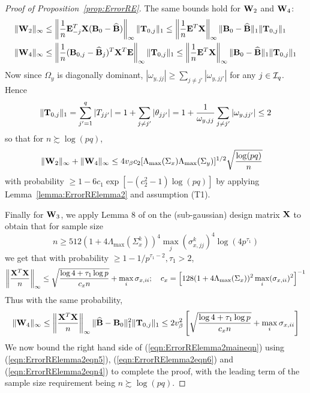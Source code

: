 \documentclass[12pt, letterpaper]{article}
\numberwithin{equation}{section}
\begin{document}
\begin{proof}[Proof of Proposition~\ref{prop:ErrorRE}]
The same bounds hold for ${\mathbf{W}}_2$ and ${\mathbf{W}}_4$:
%
\begin{align*}
\| {\mathbf{W}}_2 \|_\infty & \leq \left\| \frac{1}{n} {\mathbf{E}}_{-j}^T {\mathbf{X}} ({\mathbf{B}}_0 - \widehat {{\mathbf{B}}}) \right\|_\infty \| {\mathbf{T}}_{0,j} \|_1 \leq
\left\| \frac{1}{n} {\mathbf{E}}^T {\mathbf{X}} \right\|_\infty \| {\mathbf{B}}_0 - \widehat {{\mathbf{B}}} \|_1 \| {\mathbf{T}}_{0,j} \|_1\\
\| {\mathbf{W}}_4 \|_\infty & \leq \left\| \frac{1}{n} ({\mathbf{B}}_{0,j} - \widehat {{\mathbf{B}}}_j)^T {\mathbf{X}}^T {\mathbf{E}} \right\|_\infty \| {\mathbf{T}}_{0,j} \|_1 \leq
\left\| \frac{1}{n} {\mathbf{E}}^T {\mathbf{X}} \right\|_\infty \| {\mathbf{B}}_0 - \widehat {{\mathbf{B}}} \|_1 \| {\mathbf{T}}_{0,j} \|_1\\
\end{align*}
%
Now since $\Omega_y$ is diagonally dominant, $|\omega_{y,jj}| \geq \sum_{j \neq j'} |\omega_{y,jj'}|$ for any $j \in {\cal{I}}_q$. Hence
%
$$
\| {\mathbf{T}}_{0,j} \|_1 = \sum_{j'=1}^q | T_{jj'} | = 1 + \sum_{j \neq j'} | \theta_{jj'} | = 1 + \frac{1}{\omega_{y,jj}} \sum_{j \neq j'} | \omega_{y,jj'} | \leq 2
$$
%
so that for $n \succsim \log (pq)$,
%
\begin{align}\label{eqn:ErrorRElemma2eqn6}
\| {\mathbf{W}}_2 \|_\infty + \| {\mathbf{W}}_4 \|_\infty  & \leq
4 v_\beta c_2 [ \Lambda_{\max} (\Sigma_x) \Lambda_{\max} (\Sigma_y) ]^{1/2} \sqrt{\frac{ \log(pq)}{n}}
\end{align}
%
with probability $\geq 1 - 6c_1 \exp [-(c_2^2-1) \log(pq)]$ by applying Lemma~\ref{lemma:ErrorRElemma2} and assumption (T1).

Finally for ${\mathbf{W}}_3$, we apply Lemma 8 of \cite{RavikumarEtal11} on the (sub-gaussian) design matrix ${\mathbf{X}}$ to obtain that for sample size
$$
n \geq 512 ( 1 + 4 \Lambda_{\max} (\Sigma_x^k))^4 \max_j (\sigma_{x,jj}^k )^4 \log (4p^{\tau_1})
$$
%
we get that with probability $ \geq 1 - 1/p^{\tau_1-2}, \tau_1 > 2$,
%
$$
\left\| \frac{{\mathbf{X}}^T {\mathbf{X}}}{n} \right\|_\infty \leq \sqrt{ \frac{ \log 4 + \tau_1 \log p}{c_x n}} + \max_i \sigma_{x,ii}; \quad
c_x = \left[ 128 ( 1 + 4 \Lambda_{\max} (\Sigma_x)  )^2 \max_i (\sigma_{x,ii})^2 \right]^{-1}
$$
%
Thus with the same probability,
%
\begin{align}\label{eqn:ErrorRElemma2eqn4}
\| {\mathbf{W}}_4 \|_\infty \leq \left\| \frac{{\mathbf{X}}^T {\mathbf{X}}}{n} \right\|_\infty \| \widehat {{\mathbf{B}}} - {\mathbf{B}}_0 \|_1^2 \| {\mathbf{T}}_{0,j} \|_1 
\leq 2 v_\beta^2 \left[ \sqrt{ \frac{ \log 4 + \tau_1 \log p}{c_x n}} + \max_i \sigma_{x,ii} \right]
\end{align}
%
We now bound the right hand side of (\ref{eqn:ErrorRElemma2maineqn}) using (\ref{eqn:ErrorRElemma2eqn5}), (\ref{eqn:ErrorRElemma2eqn6}) and (\ref{eqn:ErrorRElemma2eqn4}) to complete the proof, with the leading term of the sample size requirement being $n \succsim \log(pq)$.


\end{proof}
\end{document}
